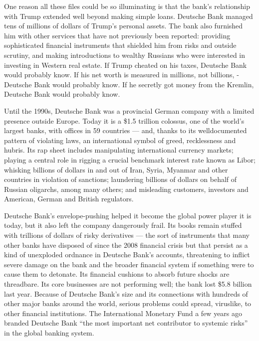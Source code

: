 One reason all these files could be so illuminating is that the bank's
relationship with Trump extended well beyond making simple loans.
­Deutsche Bank managed tens of millions of dollars of Trump's personal
assets. The bank also furnished him with other services that have not
previously been reported: providing sophisticated financial instruments
that shielded him from risks and outside scrutiny, and making
introductions to wealthy Russians who were interested in investing in
Western real estate. If Trump cheated on his taxes, ­Deutsche Bank would
probably know. If his net worth is measured in millions, not billions,
­Deutsche Bank would probably know. If he secretly got money from the
Kremlin, ­Deutsche Bank would probably know.

Until the 1990s, ­Deutsche Bank was a provincial German company with a
limited presence outside Europe. Today it is a \$1.5 trillion colossus,
one of the world's largest banks, with offices in 59 countries --- and,
thanks to its well­documented pattern of violating laws, an
international symbol of greed, recklessness and hubris. Its rap sheet
includes manipulating international currency markets; playing a central
role in rigging a crucial benchmark interest rate known as Libor;
whisking billions of dollars in and out of Iran, Syria, Myanmar and
other countries in violation of sanctions; laundering billions of
dollars on behalf of Russian oligarchs, among many others; and
misleading customers, investors and American, German and British
regulators.

­Deutsche Bank's envelope-­pushing helped it become the global power
player it is today, but it also left the company dangerously frail. Its
books remain stuffed with trillions of dollars of risky derivatives ---
the sort of instruments that many other banks have disposed of since the
2008 financial crisis but that persist as a kind of unexploded ordnance
in ­Deutsche Bank's accounts, threatening to inflict severe damage on
the bank and the broader financial system if something were to cause
them to detonate. Its financial cushions to absorb future shocks are
threadbare. Its core businesses are not performing well; the bank lost
\$5.8 billion last year. Because of Deutsche Bank's size and its
connections with hundreds of other major banks around the world, serious
problems could spread, virus­like, to other financial institutions. The
International Monetary Fund a few years ago branded ­Deutsche Bank ``the
most important net contributor to systemic risks'' in the global banking
system.

